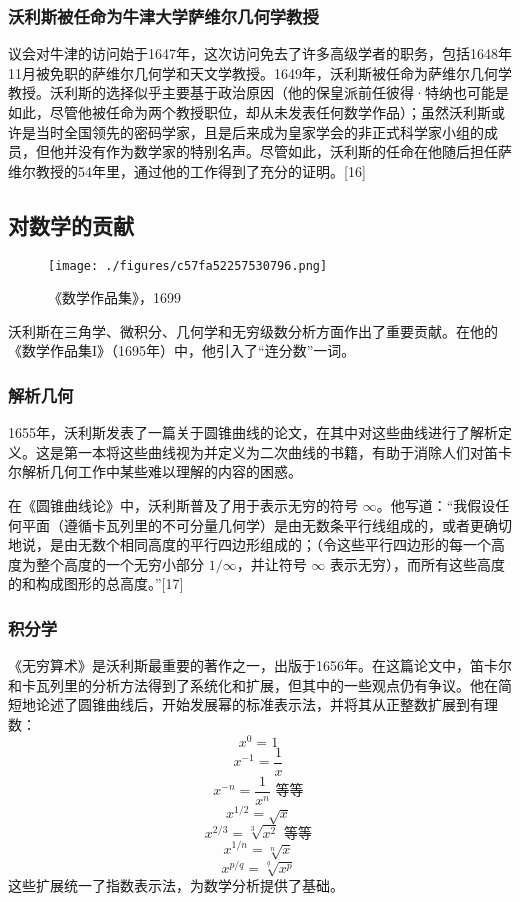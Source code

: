 \subsubsection{沃利斯被任命为牛津大学萨维尔几何学教授}
议会对牛津的访问始于1647年，这次访问免去了许多高级学者的职务，包括1648年11月被免职的萨维尔几何学和天文学教授。1649年，沃利斯被任命为萨维尔几何学教授。沃利斯的选择似乎主要基于政治原因（他的保皇派前任彼得·特纳也可能是如此，尽管他被任命为两个教授职位，却从未发表任何数学作品）；虽然沃利斯或许是当时全国领先的密码学家，且是后来成为皇家学会的非正式科学家小组的成员，但他并没有作为数学家的特别名声。尽管如此，沃利斯的任命在他随后担任萨维尔教授的54年里，通过他的工作得到了充分的证明。[16]
\subsection{对数学的贡献}
\begin{figure}[ht]
\centering
\texttt{[image: ./figures/c57fa52257530796.png]}
\caption{《数学作品集》，1699} \label{fig_YHALS_2}
\end{figure}
沃利斯在三角学、微积分、几何学和无穷级数分析方面作出了重要贡献。在他的《数学作品集I》（1695年）中，他引入了“连分数”一词。
\subsubsection{解析几何}
1655年，沃利斯发表了一篇关于圆锥曲线的论文，在其中对这些曲线进行了解析定义。这是第一本将这些曲线视为并定义为二次曲线的书籍，有助于消除人们对笛卡尔解析几何工作中某些难以理解的内容的困惑。

在《圆锥曲线论》中，沃利斯普及了用于表示无穷的符号 \(\infty\)。他写道：“我假设任何平面（遵循卡瓦列里的不可分量几何学）是由无数条平行线组成的，或者更确切地说，是由无数个相同高度的平行四边形组成的；（令这些平行四边形的每一个高度为整个高度的一个无穷小部分 \(1/\infty\)，并让符号 \(\infty\) 表示无穷），而所有这些高度的和构成图形的总高度。”[17]
\subsubsection{积分学}
《无穷算术》是沃利斯最重要的著作之一，出版于1656年。在这篇论文中，笛卡尔和卡瓦列里的分析方法得到了系统化和扩展，但其中的一些观点仍有争议。他在简短地论述了圆锥曲线后，开始发展幂的标准表示法，并将其从正整数扩展到有理数：
\[
x^0 = 1~
\]
\[
x^{-1} = \frac{1}{x}~
\]
\[
x^{-n} = \frac{1}{x^n} \text{ 等等}~
\]
\[
x^{1/2} = \sqrt{x}~
\]
\[
x^{2/3} = \sqrt[3]{x^2} \text{ 等等}~
\]
\[
x^{1/n} = \sqrt[n]{x}~
\]
\[
x^{p/q} = \sqrt[q]{x^p}~
\]
这些扩展统一了指数表示法，为数学分析提供了基础。
